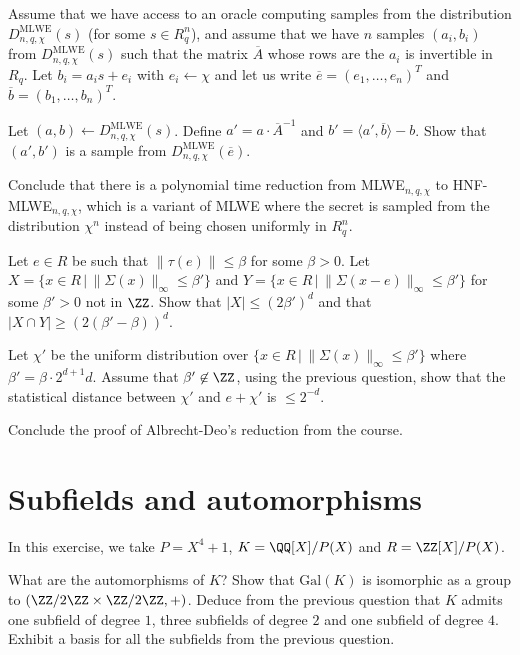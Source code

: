 \documentclass[11pt]{exam}
\theoremstyle{definition}
\begin{document}
\begin{questions}

\question Assume that we have access to an oracle computing samples from the distribution $D^{\textrm{MLWE}}_{n,q,\chi}(s)$ (for some $s \in R_q^n$), and assume that we have $n$ samples $(a_i, b_i)$ from $D^{\textrm{MLWE}}_{n,q,\chi}(s)$ such that
the matrix $\overline{A}$ whose rows are the $a_i$ is invertible in $R_q$. Let $b_i = a_i s + e_i$ with $e_i \leftarrow \chi$ and let us write $\overline{e} = (e_1, \dots, e_n)^T$ and $\overline{b} = (b_1, \dots, b_n)^T$.

Let $(a,b) \leftarrow D^{\textrm{MLWE}}_{n,q,\chi}(s)$. Define $a' = a \cdot \overline{A}^{-1}$ and $b' = \langle a', \overline{b} \rangle - b$. Show that $(a', b')$ is a sample from $D^{\textrm{MLWE}}_{n,q,\chi}(\overline{e})$.

\question Conclude that there is a polynomial time reduction from MLWE$_{n,q,\chi}$ to HNF-MLWE$_{n,q,\chi}$, which is a variant of MLWE where the secret is sampled from the distribution $\chi^n$ instead of being chosen uniformly in $R_q^n$.

\question Let $e \in R$ be such that $\|\tau(e) \| \leq \beta$ for some $\beta > 0$. Let $X = \{x \in R\,|\, \|\Sigma(x)\|_\infty \leq \beta'\}$ and $Y = \{x \in R\,|\, \|\Sigma(x-e)\|_\infty \leq \beta'\}$ for some $\beta' > 0$ not in $\ZZ$. Show that $|X| \leq (2\beta')^d$ and that $|X \cap Y| \geq (2(\beta'-\beta))^d$.

\question Let $\chi'$ be the uniform distribution over $\{x \in R\,|\, \|\Sigma(x)\|_\infty \leq \beta'\}$ where $\beta' = \beta \cdot 2^{d+1}d$. Assume that $\beta' \not \in \ZZ$, using the previous question, show that the statistical distance between $\chi'$ and $e+\chi'$ is $\leq 2^{-d}$.

\question Conclude the proof of Albrecht-Deo's reduction from the course.
\end{questions}

\section{Subfields and automorphisms}

In this exercise, we take $P = X^4+1$, $K = \QQ[X]/P(X)$ and $R = \ZZ[X]/P(X)$.
\begin{questions}
\question What are the automorphisms of $K$? Show that $\mathrm{Gal}(K)$ is isomorphic as a group to $(\ZZ/2\ZZ \times \ZZ/2\ZZ,+)$.
\question Deduce from the previous question that $K$ admits one subfield of degree $1$, three subfields of degree $2$ and one subfield of degree $4$.
\question Exhibit a basis for all the subfields from the previous question.

\end{questions}
\end{document}
